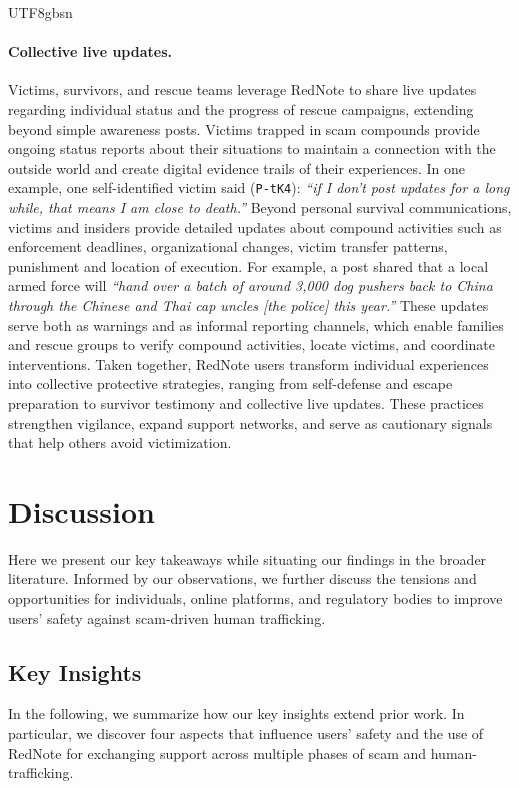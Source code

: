 \documentclass[sigconf,nonacm]{acmart}
\newcommand{\rev}[1]{#1}
\begin{document}
\begin{CJK}{UTF8}{gbsn}
\paragraph{\textbf{Collective live updates.}}
Victims, survivors, and rescue teams leverage RedNote to share live updates regarding individual status and the progress of rescue campaigns, extending beyond simple awareness posts. Victims trapped in scam compounds provide ongoing status reports about their situations to maintain a connection with the outside world and create digital evidence trails of their experiences. In one example, one self-identified victim said (\texttt{P-tK4}): \textit{``if I don't post updates for a long while, that means I am close to death.''} Beyond personal survival communications, victims and insiders provide detailed updates about compound activities such as enforcement deadlines, organizational changes, victim transfer patterns, punishment and location of execution. For example, a post shared that a local armed force will \textit{``hand over a batch of around 3,000 dog pushers back to China through the Chinese and Thai cap uncles [the police] this year.''} These updates serve both as warnings and as informal reporting channels, which enable families and rescue groups to verify compound activities, locate victims, and coordinate interventions. Taken together, RedNote users transform individual experiences into collective protective strategies, ranging from self-defense and escape preparation to survivor testimony and collective live updates. These practices strengthen vigilance, expand support networks, and serve as cautionary signals that help others avoid victimization.

\section{Discussion}
\label{sec:discussion}

Here we present our key takeaways while situating our findings in the broader literature. Informed by our observations, we further discuss the tensions and opportunities for individuals, online platforms, and regulatory bodies to improve users' safety against scam-driven human trafficking.

\subsection{Key Insights}

\rev{In the following, we summarize how our key insights extend prior work. In particular, we discover four aspects that influence users' safety and the use of RedNote for exchanging support across multiple phases of scam and human-trafficking.}


\end{CJK}
\end{document}
